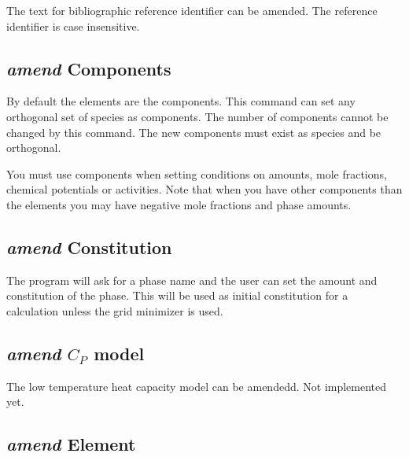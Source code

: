 \documentclass[12pt]{article}
\begin{document}
The text for bibliographic reference identifier can be amended.  The
reference identifier is case insensitive.

\subsection{{\em amend} Components}

By default the elements are the components.  This command can set any
orthogonal set of species as components.  The number of components
cannot be changed by this command.  The new components must exist as
species and be orthogonal.

You must use components when setting conditions on amounts, mole
fractions, chemical potentials or activities.  Note that when you have
other components than the elements you may have negative mole
fractions and phase amounts.

\subsection{{\em amend} Constitution}

The program will ask for a phase name and the user can set the amount
and constitution of the phase.  This will be used as initial
constitution for a calculation unless the grid minimizer is used.

\subsection{{\em amend} $C_P$ model}

The low temperature heat capacity model can be amendedd.  Not
implemented yet.

\subsection{{\em amend} Element}
\end{document}
